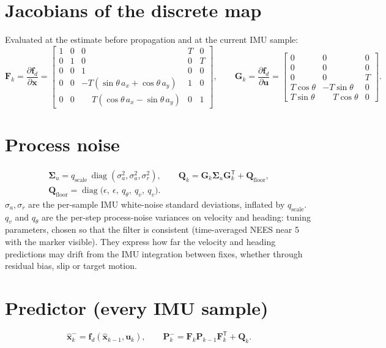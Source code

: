 \documentclass[11pt,a4paper]{article}
\newcommand{\vect}[1]{\bm{#1}}
\newcommand{\mat}[1]{\bm{#1}}
\newcommand{\T}{^{\mathsf{T}}}
\newcommand{\diag}{\operatorname{diag}}
\newcommand{\hx}{\hat{\vect{x}}}
\begin{document}
\section{Jacobians of the discrete map}
Evaluated at the estimate before propagation and at the current IMU sample:
\begin{equation}
\mat F_k = \frac{\partial\vect f_d}{\partial\vect x} =
\begin{bmatrix}
1 & 0 & 0 & T & 0 \\
0 & 1 & 0 & 0 & T \\
0 & 0 & 1 & 0 & 0 \\
0 & 0 & -T(\sin\theta\,a_x + \cos\theta\,a_y) & 1 & 0 \\
0 & 0 & \phantom{-}T(\cos\theta\,a_x - \sin\theta\,a_y) & 0 & 1
\end{bmatrix},
\qquad
\mat G_k = \frac{\partial\vect f_d}{\partial\vect u} =
\begin{bmatrix}
0 & 0 & 0 \\
0 & 0 & 0 \\
0 & 0 & T \\
T\cos\theta & -T\sin\theta & 0 \\
T\sin\theta & \phantom{-}T\cos\theta & 0
\end{bmatrix}.
\end{equation}

\section{Process noise}
\begin{gather}
\mat\Sigma_u = q_{\mathrm{scale}}\,\diag(\sigma_a^2,\sigma_a^2,\sigma_r^2),
\qquad
\mat Q_k = \mat G_k\mat\Sigma_u\mat G_k\T + \mat Q_{\mathrm{floor}},\\
\mat Q_{\mathrm{floor}} = \diag\!\big(\epsilon,\ \epsilon,\ q_\theta,\ q_v,\ q_v\big).
\end{gather}
$\sigma_a,\sigma_r$ are the per-sample IMU white-noise standard deviations, inflated by $q_{\mathrm{scale}}$. $q_v$ and $q_\theta$ are the per-step process-noise variances on velocity and heading: tuning parameters, chosen so that the filter is consistent (time-averaged NEES near 5 with the marker visible). They express how far the velocity and heading predictions may drift from the IMU integration between fixes, whether through residual bias, slip or target motion.

\section{Predictor (every IMU sample)}
\begin{equation}
\hx_k^- = \vect f_d(\hx_{k-1},\vect u_k),
\qquad
\mat P_k^- = \mat F_k\mat P_{k-1}\mat F_k\T + \mat Q_k.
\end{equation}
\end{document}
